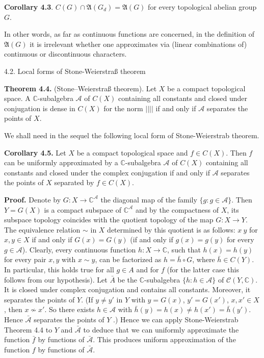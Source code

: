 \documentclass[12pt]{article}
\begin{document}
\textbf{Corollary 4.3}. $C(G) \cap \mathfrak{A}(G_d) = \mathfrak{A}(G)$ for every topological abelian group $G$.


In other words, as far as continuous functions are concerned, in the definition of $\mathfrak{A}(G)$ it is irrelevant whether one
approximates via (linear combinations of) continuous or discontinuous characters.


4.2. Local forms of Stone-Weierstraß theorem


\textbf{Theorem 4.4.} (Stone–Weierstraß theorem). Let $X$ be a compact topological space. A $\mathbb{C}$-subalgebra $\mathcal{A}$ of $C(X)$ containing all constants
and closed under conjugation is dense in $C(X)$ for the norm $|| ||$ if and only if $\mathcal{A}$ separates the points of $X$.


    We shall need in the sequel the following local form of Stone-Weierstrab theorem.


\textbf{Corollary 4.5.} Let $X$ be a compact topological space and $f \in C(X)$. Then $f$ can be uniformly approximated by a $\mathbb{C}$-subalgebra $\mathcal{A}$
of $C(X)$ containing all constants and closed under the complex conjugation if and only if $\mathcal{A}$ separates the points of $X$ separated by
$f \in C(X)$.


\textbf{Proof.} Denote by $G : X \to \mathbb{C}^{\mathcal{A}}$ the diagonal map of the family $\{g: g \in \mathcal{A}\}$. Then $Y = G(X)$ is a compact subspace of $\mathbb{C}^{\mathcal{A}}$ and
by the compactness of $X$, its subspace topology coincides with the quotient topology of the map $G : X \to Y$. The equivalence
relation $\sim$ in $X$ determined by this quotient is as follows: $x ~ y$ for $x, y \in X$ if and only if $G(x) = G(y)$ (if and only if
$g(x) = g(y)$ for every $g \in \mathcal{A}$). Clearly, every continuous function $h : X \to \mathbb{C}$, such that $h(x) = h(y)$ for every pair $x, y$ with
$x \sim y$, can be factorized as $h = \bar{h} \circ G$, where $\bar{h} \in C(Y)$. In particular, this holds true for all $g \in A$ and for $f$ (for the latter case
this follows from our hypothesis). Let $\bar{A}$ be the $\mathbb{C}$-subalgebra $\{h: h \in \mathcal{A}\}$ of $\mathcal{C}(Y, \mathbb{C})$. It is closed under complex conjugation
and contains all constants. Moreover, it separates the points of $Y$. (If $y \neq y'$ in $Y$ with $y = G(x)$, $y' = G(x')$, $x, x' \in X$, then
$x \nsim x'$. So there exists $h \in \mathcal{A}$ with $\bar{h}(y) = h(x) \neq h(x') = \bar{h}(y')$. Hence $\bar{\mathcal{A}}$ separates the points of $Y$ .) Hence we can apply
Stone-Weierstrab Theorem 4.4 to $Y$ and $\bar{\mathcal{A}}$ to deduce that we can uniformly approximate the function $\bar{f}$ by functions of $\bar{\mathcal{A}}$.
This produces uniform approximation of the function $f$ by functions of $\bar{\mathcal{A}}$. 
\end{document}

